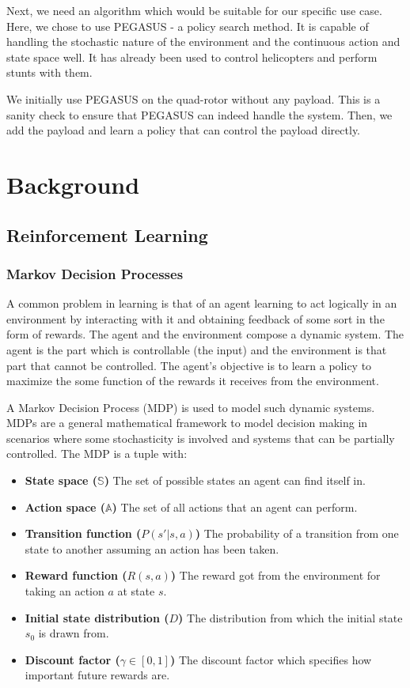 \documentclass[hidelinks,BTech]{iitmdiss}
\begin{document}
Next, we need an algorithm which would be suitable for our specific use case. Here, we chose to use PEGASUS - a policy search method. It is capable of handling the stochastic nature of the environment and the continuous action and state space well. It has already been used to control helicopters and perform stunts with them.

We initially use PEGASUS on the quad-rotor without any payload. This is a sanity check to ensure that PEGASUS can indeed handle the system. Then, we add the payload and learn a policy that can control the payload directly.

\chapter{Background}

\section{Reinforcement Learning}

\subsection{Markov Decision Processes}
A common problem in learning is that of an agent learning to act logically in an environment by interacting with it and obtaining feedback of some sort in the form of rewards. The agent and the environment compose a dynamic system. The agent is the part which is controllable (the input) and the environment is that part that cannot be controlled. The agent's objective is to learn a policy to maximize the some function of the rewards it receives from the environment.

A Markov Decision Process \cite{MarkovDecisionProcess} (MDP) is used to model such dynamic systems. MDPs are a general mathematical framework to model decision making in scenarios where some stochasticity is involved and systems that can be partially controlled. The MDP is a tuple with:
\begin{itemize}
\item{{\bf State space ($\mathbb{S}$)} The set of possible states an agent can find itself in.}
\item{{\bf Action space ($\mathbb{A}$)} The set of all actions that an agent can perform.}
\item{{\bf Transition function ($P(s'|s,a)$)} The probability of a transition from one state to another assuming an action has been taken.}
\item{{\bf Reward function ($R(s, a)$)} The reward got from the environment for taking an action $a$ at state $s$.}
\item{{\bf Initial state distribution ($D$)} The distribution from which the initial state $s_0$ is drawn from.}
\item{{\bf Discount factor ($\gamma \in [0,1]$)} The discount factor which specifies how important future rewards are.}
\end{itemize}
\end{document}
